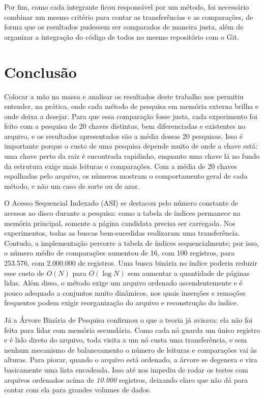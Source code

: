\documentclass[12pt,a4paper]{article}
\begin{document}
Por fim, como cada integrante ficou responsável por um método, foi necessário combinar
um mesmo critério para contar as transferências e as comparações, de forma que os
resultados pudessem ser comparados de maneira justa, além de organizar a integração do
código de todos no mesmo repositório com o Git.

\section{Conclusão}

Colocar a mão na massa e analisar os resultados deste trabalho nos permitiu entender,
na prática, onde cada método de pesquisa em memória externa brilha e onde deixa a
desejar. Para que essa comparação fosse justa, cada experimento foi feito com a
pesquisa de 20 chaves distintas, bem diferenciadas e existentes no arquivo, e os
resultados apresentados são a média dessas 20 pesquisas. Isso é importante porque o
custo de uma pesquisa depende muito de onde a chave está: uma chave perto da raiz é
encontrada rapidinho, enquanto uma chave lá no fundo da estrutura exige mais leituras e
comparações. Com a média de 20 chaves espalhadas pelo arquivo, os números mostram o
comportamento geral de cada método, e não um caso de sorte ou de azar.

O Acesso Sequencial Indexado (ASI) se destacou pelo número constante de acessos ao
disco durante a pesquisa: como a tabela de índices permanece na memória principal,
somente a página candidata precisa ser carregada. Nos experimentos, todas as buscas
bem-sucedidas realizaram uma transferência. Contudo, a implementação percorre a tabela
de índices sequencialmente; por isso, o número médio de comparações aumentou de 16,
com 100 registros, para 253.576, com 2.000.000 de registros. Uma busca binária no
índice poderia reduzir esse custo de $O(N)$ para $O(\log N)$ sem aumentar a quantidade
de páginas lidas. Além disso, o método exige um arquivo ordenado ascendentemente e é
pouco adequado a conjuntos muito dinâmicos, nos quais inserções e remoções frequentes
podem exigir reorganização do arquivo e reconstrução do índice.

Já a Árvore Binária de Pesquisa confirmou o que a teoria já avisava: ela não foi feita
para lidar com memória secundária. Como cada nó guarda um único registro e é lido
direto do arquivo, toda visita a um nó custa uma transferência, e sem nenhum mecanismo
de balanceamento o número de leituras e comparações vai às alturas. Para piorar, quando
o arquivo está ordenado, a árvore se degenera e vira basicamente uma lista encadeada.
Isso até nos impediu de rodar os testes com arquivos ordenados acima de
\textit{10.000} registros, deixando claro que não dá para contar com ela para grandes
volumes de dados.
\end{document}

